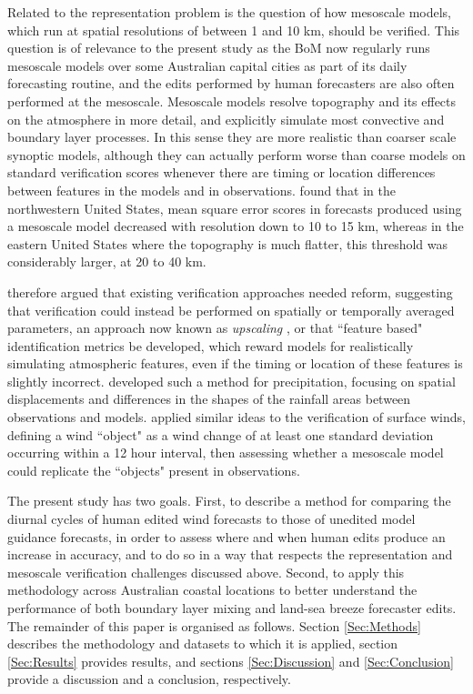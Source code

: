 \documentclass{ametsoc}
\begin{document}
Related to the representation problem is the question of how mesoscale models, which run at spatial resolutions of between 1 and 10 km, should be verified. This question is of relevance to the present study as the BoM now regularly runs mesoscale models over some Australian capital cities as part of its daily forecasting routine, and the edits performed by human forecasters are also often performed at the mesoscale. Mesoscale models resolve topography and its effects on the atmosphere in more detail, and explicitly simulate most convective and boundary layer processes. In this sense they are more realistic than coarser scale synoptic models, although they can actually perform worse than coarse models on standard verification scores whenever there are timing or location differences between features in the models and in observations. \citet{mass02} found that in the northwestern United States, mean square error scores in forecasts produced using a mesoscale model decreased with resolution down to 10 to 15 km, whereas in the eastern United States where the topography is much flatter, this threshold was considerably larger, at 20 to 40 km. 

\citet{mass02} therefore argued that existing verification approaches needed reform, suggesting that verification could instead be performed on spatially or temporally averaged parameters, an approach now known as \textit{upscaling} \citep{ebert08}, or that ``feature based" identification metrics be developed, which reward models for realistically simulating atmospheric features, even if the timing or location of these features is slightly incorrect. \citet{ebert00} developed such a method for precipitation, focusing on spatial displacements and differences in the shapes of the rainfall areas between observations and models. \citet{rife05} applied similar ideas to the verification of surface winds, defining a wind ``object" as a wind change of at least one standard deviation occurring within a 12 hour interval, then assessing whether a mesoscale model could replicate the ``objects" present in observations.   

The present study has two goals. First, to describe a method for comparing the diurnal cycles of human edited wind forecasts to those of unedited model guidance forecasts, in order to assess where and when human edits produce an increase in accuracy, and to do so in a way that respects the representation and mesoscale verification challenges discussed above. Second, to apply this methodology across Australian coastal locations to better understand the performance of both boundary layer mixing and land-sea breeze forecaster edits. The remainder of this paper is organised as follows. Section \ref{Sec:Methods} describes the methodology and datasets to which it is applied, section \ref{Sec:Results} provides results, and sections \ref{Sec:Discussion} and \ref{Sec:Conclusion} provide a discussion and a conclusion, respectively.
\end{document}
